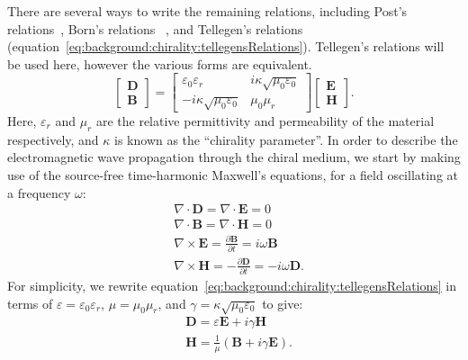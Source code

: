 There are several ways to write the remaining relations, including Post's relations~\cite{Capolino2009}, Born's relations~\cite{Lekner1999, Barnett2016} , and Tellegen's relations~\cite{Capolino2009,kong1986,lindell1994} (equation~\ref{eq:background:chirality:tellegensRelations}). Tellegen's relations will be used here, however the various forms are equivalent.
\begin{equation}\label{eq:background:chirality:tellegensRelations}
    \begin{bmatrix}
        \mathbf{D} \\
        \mathbf{B}
    \end{bmatrix}
    =
    \begin{bmatrix}
        \varepsilon_0 \varepsilon_r & i \kappa \sqrt{\mu_0 \varepsilon_0} \\
        -i \kappa \sqrt{\mu_0 \varepsilon_0} & \mu_0 \mu_r
    \end{bmatrix}
    \begin{bmatrix}
        \mathbf{E} \\
        \mathbf{H}
    \end{bmatrix}.
\end{equation}
Here, ${{\varepsilon }_{r}}$ and $\mu_r$ are the relative permittivity and permeability of the material respectively, and $\kappa$ is known as the ``chirality parameter''. In order to describe the electromagnetic wave propagation through the chiral medium, we start by making use of the source-free time-harmonic Maxwell's equations, for a field oscillating at a frequency $\omega$:
\begin{align}
    & \nabla \cdot \mathbf{D} = \nabla \cdot \mathbf{E} = 0 \label{eq:background:chirality:maxwellD}\\
    & \nabla \cdot \mathbf{B} = \nabla \cdot \mathbf{H} = 0 \label{eq:background:chirality:maxwellB}\\
    & \nabla \times \mathbf{E} = \frac{\partial \mathbf{B}}{\partial t} = i \omega \mathbf{B} \label{eq:background:chirality:maxwellE}\\
    & \nabla \times \mathbf{H} =  -\frac{\partial \mathbf{D}}{\partial t} = -i \omega \mathbf{D} \label{eq:background:chirality:maxwellH}.
\end{align}
For simplicity, we rewrite equation~\ref{eq:background:chirality:tellegensRelations} in terms of $\varepsilon = \varepsilon_0 \varepsilon_r$, $\mu = \mu_0 \mu_r$, and $\gamma = \kappa \sqrt{\mu_0 \varepsilon_0}$ to give:
\begin{align}
    & \mathbf{D} = \varepsilon \mathbf{E} + i \gamma \mathbf{H} \label{eq:background:chirality:tellegensSimplifiedD} \\
    & \mathbf{H} = \frac{1}{\mu}( \mathbf{B} + i \gamma \mathbf{E} ) \label{eq:background:chirality:tellegensSimplifiedH}.
\end{align}
